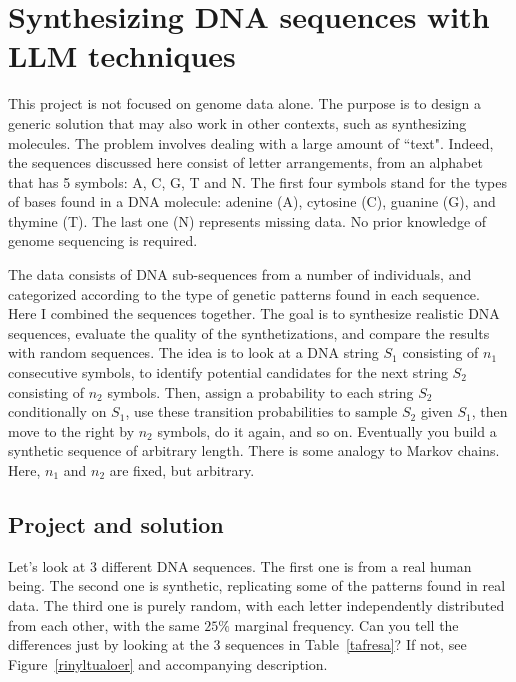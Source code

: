 \documentclass[oneside,10pt]{book}
\begin{document}
\section{Synthesizing DNA sequences with LLM techniques}\label{dnalove}

This project is not focused on genome data alone. The purpose is to design a generic solution that may also work in other contexts, such as
 synthesizing molecules. The problem involves dealing with a large amount of ``text". Indeed, the sequences discussed here consist of 
 letter arrangements, from an alphabet that has 5 symbols:  A, C, G, T and N.  The first four symbols stand for the  types of bases found in a DNA molecule: adenine (A), cytosine (C), guanine (G), and thymine (T). The last one (N) represents missing data. No prior knowledge of
  genome sequencing is required.

The data consists of DNA sub-sequences from a number of individuals, and categorized according to the type of genetic patterns found in each
 sequence. Here I combined the sequences together. The goal is to synthesize realistic DNA sequences, evaluate the quality of the synthetizations, and
 compare the results with random sequences.  The idea is to look at a DNA string $S_1$ consisting of $n_1$ consecutive symbols, to identify
  potential candidates for the next string $S_2$ consisting of $n_2$ symbols. Then, assign a probability to each string $S_2$ conditionally
 on $S_1$, use these transition probabilities to sample $S_2$ given $S_1$, then move to the right by $n_2$ symbols, do it again, and so on. 
 Eventually you build a synthetic sequence of arbitrary length. There is some analogy to \textcolor{index}{Markov chains}. 
 Here, $n_1$ and $n_2$ are fixed, but arbitrary.

\subsection{Project and solution}\label{pscaokesour}

Let's look at 3 different DNA sequences. The first one is from a real human being. The second one is synthetic, replicating some of the patterns found in real data. The third one is purely random, with each letter 
 independently distributed from each other, with the same $25\%$ marginal frequency. Can you tell the differences 
just by looking at the 3 sequences in Table~\ref{tafresa}? If not, see Figure~\ref{rinyltualoer} and accompanying description. 
\vspace{1ex}
\end{document}
